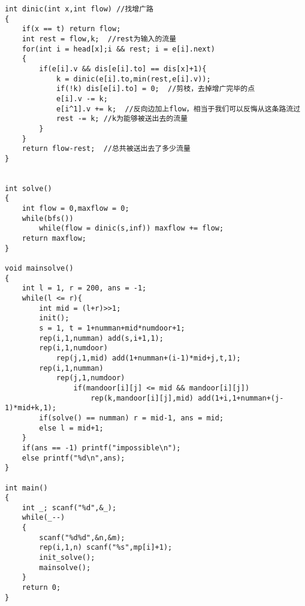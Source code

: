\documentclass[twoside]{article}
\begin{document}
\begin{lstlisting}
int dinic(int x,int flow) //找增广路 
{	
	if(x == t) return flow;
	int rest = flow,k;  //rest为输入的流量 
	for(int i = head[x];i && rest; i = e[i].next)
	{
		if(e[i].v && dis[e[i].to] == dis[x]+1){
			k = dinic(e[i].to,min(rest,e[i].v));
			if(!k) dis[e[i].to] = 0;  //剪枝，去掉增广完毕的点 
			e[i].v -= k;
			e[i^1].v += k;  //反向边加上flow，相当于我们可以反悔从这条路流过 
			rest -= k; //k为能够被送出去的流量 
		}
	}
	return flow-rest;  //总共被送出去了多少流量 
}


int solve()
{
	int flow = 0,maxflow = 0;
	while(bfs())
		while(flow = dinic(s,inf)) maxflow += flow;
	return maxflow;
}

void mainsolve()
{
	int l = 1, r = 200, ans = -1;
	while(l <= r){
		int mid = (l+r)>>1;
		init();
		s = 1, t = 1+numman+mid*numdoor+1;
		rep(i,1,numman) add(s,i+1,1);
		rep(i,1,numdoor)
			rep(j,1,mid) add(1+numman+(i-1)*mid+j,t,1);
		rep(i,1,numman)
			rep(j,1,numdoor)
				if(mandoor[i][j] <= mid && mandoor[i][j])
					rep(k,mandoor[i][j],mid) add(1+i,1+numman+(j-1)*mid+k,1);
		if(solve() == numman) r = mid-1, ans = mid;
		else l = mid+1;
	}
	if(ans == -1) printf("impossible\n");
	else printf("%d\n",ans);
}

int main()
{
	int _; scanf("%d",&_);
	while(_--)
	{
		scanf("%d%d",&n,&m);
		rep(i,1,n) scanf("%s",mp[i]+1);
		init_solve();
		mainsolve();
	}
	return 0;
} \end{lstlisting}
\end{document}
